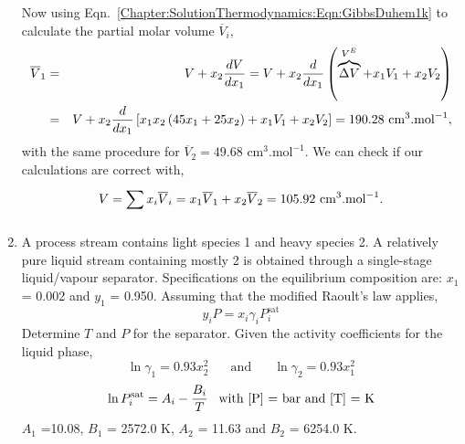 \begin{enumerate}[1)]
              Now using Eqn.~\ref{Chapter:SolutionThermodynamics:Eqn:GibbsDuhem1k} to calculate the partial molar volume $\overline{V}_{i}$,
                 \begin{eqnarray}
                    \overline{V}_{1} &=& V + x_{2}\frc{dV}{dx_{1}} = V + x_{2}\frc{d}{dx_{1}} \left(\overbrace{\Delta V}^{V^{E}} + x_{1}V_{1} + x_{2}V_{2}\right) \nonumber \\
                         &=& V + x_{2}\frc{d}{dx_{1}} \left[x_{1}x_{2}\left(45x_{1}+25x_{2}\right)+x_{1}V_{1}+x_{2}V_{2}\right] = 190.28\text{ cm}^{3}.\text{mol}^{-1}, \nonumber
                 \end{eqnarray}
              with the same procedure for $\overline{V}_{2}=49.68\text{ cm}^{3}.\text{mol}^{-1}$. We can check if our calculations are correct with,
                 \begin{displaymath}
                      V = \summation[x_{i}\overline{V}_{i}]{}{} = x_{1}\overline{V}_{1} + x_{2}\overline{V}_{2} = 105.92\text{ cm}^{3}.\text{mol}^{-1}.
                 \end{displaymath}

\clearpage
            
   \item\label{Mod05Ex02}  A process stream contains light species 1 and heavy species 2. A relatively pure liquid stream containing mostly 2 is obtained through a single-stage liquid/vapour separator. Specifications on the equilibrium composition are: $x_{1}$ = 0.002 and $y_{1}$ = 0.950. Assuming that the modified Raoult's law applies, 
\begin{displaymath}
  y_{i} P = x_{i}\gamma_{i}P_{i}^{\text{sat}}
\end{displaymath} 
Determine $T$ and $P$ for the separator. Given the activity coefficients for the liquid phase,
\begin{displaymath}
\ln\gamma_{1} = 0.93x_{2}^{2} \;\;\;\;\;\text{ and }\;\;\;\;\;\ln\gamma_{2}=0.93x_{1}^{2}
\end{displaymath}
\begin{displaymath}
\ln P_{i}^{\text{sat}} = A_{i} - \frc{B_{i}}{T}\;\;\;\text{with [P] = bar and [T] = K}
\end{displaymath} 
$A_{1}$ =10.08, $B_{1}$ = 2572.0 K, $A_{2}$ = 11.63 and $B_{2}$ = 6254.0 K.


\end{enumerate}

